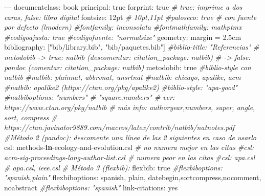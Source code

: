 \documentclass[11pt,a4paper,oneside,]{article}
\newenvironment{Shaded}{\begin{snugshade}}{\end{snugshade}}
\newcommand{\CommentTok}[1]{\textcolor[rgb]{0.56,0.35,0.01}{\textit{#1}}}
\newcommand{\ControlFlowTok}[1]{\textcolor[rgb]{0.13,0.29,0.53}{\textbf{#1}}}
\newcommand{\FloatTok}[1]{\textcolor[rgb]{0.00,0.00,0.81}{#1}}
\newcommand{\NormalTok}[1]{#1}
\newcommand{\OtherTok}[1]{\textcolor[rgb]{0.56,0.35,0.01}{#1}}
\newcommand{\SpecialCharTok}[1]{\textcolor[rgb]{0.00,0.00,0.00}{#1}}
\newcommand{\StringTok}[1]{\textcolor[rgb]{0.31,0.60,0.02}{#1}}
\numberwithin{dummy}{section}
\theoremstyle{ocrenumbox}
\theoremstyle{blacknumex}
\theoremstyle{blacknumbox}
\theoremstyle{ocrenum}
\theoremstyle{ocrenum}
\begin{document}
\begin{Shaded}
\begin{Highlighting}[numbers=left,,]
\SpecialCharTok{{-}{-}{-}}
\NormalTok{documentclass}\SpecialCharTok{:}\NormalTok{ book}
\NormalTok{principal}\SpecialCharTok{:}\NormalTok{ true}
\NormalTok{forprint}\SpecialCharTok{:}\NormalTok{ true  }\CommentTok{\# true: imprime a dos caras, false: libro digital}
\NormalTok{fontsize}\SpecialCharTok{:}\NormalTok{ 12pt }\CommentTok{\# 10pt,11pt}
\CommentTok{\#paloseco: true \# con fuente por defecto (lmodern)}
\CommentTok{\#fontfamily: inconsolata}
\CommentTok{\#fontmathfamily: mathptmx}
\CommentTok{\#codigoajusta: true}
\CommentTok{\#codigofuente: "normalsize"}
\NormalTok{geometry}\SpecialCharTok{:}\NormalTok{ margin }\OtherTok{=} \FloatTok{2.5}\NormalTok{cm}
\NormalTok{bibliography}\SpecialCharTok{:}\NormalTok{ [}\StringTok{"bib/library.bib"}\NormalTok{, }\StringTok{"bib/paquetes.bib"}\NormalTok{]}
\CommentTok{\#biblio{-}title: "Referencias"}
\CommentTok{\# metodobib {-}\textgreater{} true: natbib (descomentar: citation\_package: natbib) }
\CommentTok{\#           {-}\textgreater{} false: pandoc (comentar: citation\_package: natbib)}
\NormalTok{metodobib}\SpecialCharTok{:}\NormalTok{ true}
\CommentTok{\#biblio{-}style con natbib}
\CommentTok{\#natbib: plainnat, abbrvnat, unsrtnat}
\CommentTok{\#natbib: chicago, apalike, acm}
\CommentTok{\#natbib: apalike2 (https://ctan.org/pkg/apalike2)}
\CommentTok{\#biblio{-}style: "apa{-}good"}
\CommentTok{\#natbiboptions: "numbers" \# "square,numbers" \# ver: https://www.ctan.org/pkg/natbib}
\CommentTok{\# más info: authoryear,numbers,  super, angle, sort, compress}
\CommentTok{\# https://ctan.javinator9889.com/macros/latex/contrib/natbib/natnotes.pdf}
\CommentTok{\#Método 2 (pandoc): descomente una línea de las 2 siguientes en caso de usarlo}
\NormalTok{csl}\SpecialCharTok{:}\NormalTok{ methods}\SpecialCharTok{{-}}\ControlFlowTok{in}\SpecialCharTok{{-}}\NormalTok{ecology}\SpecialCharTok{{-}}\NormalTok{and}\SpecialCharTok{{-}}\NormalTok{evolution.csl      }\CommentTok{\# no numera mejor en las citas}
\CommentTok{\#csl: acm{-}sig{-}proceedings{-}long{-}author{-}list.csl  \# numera peor en las citas}
\CommentTok{\#csl: apa.csl  \# apa.csl, ieee.csl}
\CommentTok{\# Método 3 (flexbib):}
\NormalTok{flexbib}\SpecialCharTok{:}\NormalTok{ true}
\CommentTok{\#flexbiboptions: "spanish,plain"}
\NormalTok{flexbiboptions}\SpecialCharTok{:}\NormalTok{ spanish, plain, datebegin,sortcompress,nocomment, noabstract}
\CommentTok{\#flexbiboptions: "spanish"}
\NormalTok{link}\SpecialCharTok{{-}}\NormalTok{citations}\SpecialCharTok{:}\NormalTok{ yes}

\end{Highlighting}
\end{Shaded}
\end{document}
